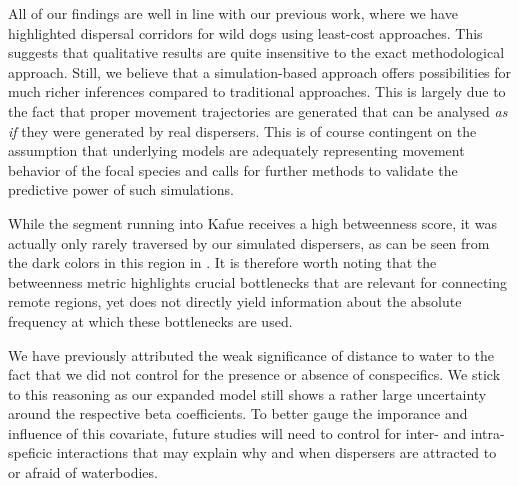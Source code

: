 \documentclass[abstract=on,10pt,a4paper,bibliography=totocnumbered]{article}
\begin{document}
All of our findings are well in line with our previous work, where we have
highlighted dispersal corridors for wild dogs using least-cost approaches. This
suggests that qualitative results are quite insensitive to the exact
methodological approach. Still, we believe that a simulation-based approach
offers possibilities for much richer inferences compared to traditional
approaches. This is largely due to the fact that proper movement trajectories
are generated that can be analysed \textit{as if} they were generated by real
dispersers. This is of course contingent on the assumption that underlying
models are adequately representing movement behavior of the focal species and
calls for further methods to validate the predictive power of such simulations.

While the segment running into Kafue receives a high betweenness score, it was
actually only rarely traversed by our simulated dispersers, as can be seen from
the dark colors in this region in . It is therefore worth noting
that the betweenness metric highlights crucial bottlenecks that are relevant for
connecting remote regions, yet does not directly yield information about the
absolute frequency at which these bottlenecks are used.

We have previously attributed the weak significance of distance to water to the
fact that we did not control for the presence or absence of conspecifics. We
stick to this reasoning as our expanded model still shows a rather large
uncertainty around the respective beta coefficients. To better gauge the
imporance and influence of this covariate, future studies will need to control
for inter- and intra-speficic interactions that may explain why and when
dispersers are attracted to or afraid of waterbodies.
\end{document}
